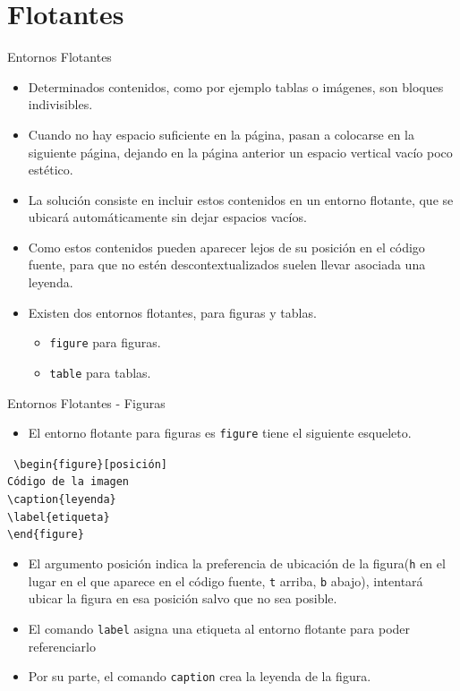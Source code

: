 \documentclass[12pt]{beamer}
\begin{document}
\section{Flotantes}
\begin{frame}{Entornos Flotantes}
\begin{itemize}
  \item<1->Determinados contenidos, como por ejemplo tablas o imágenes, son bloques indivisibles.
  \item<2->Cuando no hay espacio suficiente en la página, pasan a colocarse en la siguiente página, dejando en la página anterior un espacio vertical vacío poco estético.
  \item<3->La solución consiste en incluir estos contenidos en un entorno flotante, que se ubicará automáticamente sin dejar espacios vacíos.
  \item<4->Como estos contenidos pueden aparecer lejos de su posición en el código fuente, para que no estén descontextualizados suelen llevar asociada una leyenda.
  \item<5->Existen dos entornos flotantes, para figuras y tablas.
  \begin{itemize}
    \item <6-> \texttt{\color{blue}figure} para figuras.
    \item <7-> \texttt{\color{blue}table} para tablas.
  \end{itemize}
\end{itemize}
\end{frame}
\begin{frame}{Entornos Flotantes - Figuras}
  \begin{itemize}
    \item El entorno flotante para figuras es \texttt{\color{blue}figure} tiene el siguiente esqueleto.
  \end{itemize}
  \begin{center}
    \begin{minipage}{0.9\textwidth}
      \footnotesize
      \texttt{\color{blue}
      \textbackslash begin\{figure\}[posición]\\
      Código de la imagen\\
      \textbackslash caption\{leyenda\}\\
      \textbackslash label\{etiqueta\}\\
      \textbackslash end\{figure\}}
    \end{minipage}
  \end{center}
  \begin{itemize}
    \item<2-> El argumento posición indica la preferencia de ubicación de la figura(\texttt{\color{blue}h} en el lugar en el que aparece en el código fuente, \texttt{\color{blue}t} arriba, \texttt{\color{blue}b} abajo), intentará ubicar la figura en esa posición salvo que no sea posible.
    \item<3-> El comando \texttt{\color{blue}label} asigna una etiqueta al entorno flotante para poder referenciarlo
    \item<4-> Por su parte, el comando \texttt{\color{blue}caption} crea la leyenda de la figura.
  \end{itemize}
\end{frame}
\end{document}
